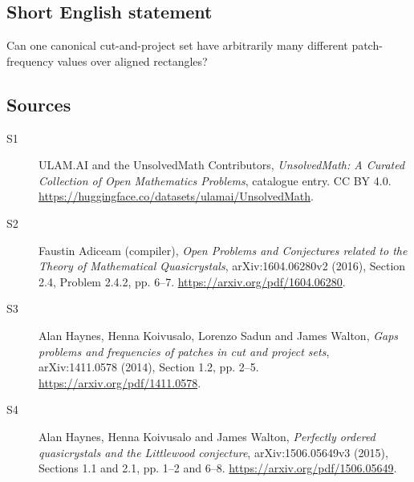 \documentclass[11pt]{article}
\begin{document}
\subsection{Short English statement}
Can one canonical cut-and-project set have arbitrarily many different patch-frequency values over aligned rectangles?
\subsection{Sources}
\begin{description}
\item[\hypertarget{source:statement:1}{S1}] ULAM.AI and the UnsolvedMath Contributors, \emph{UnsolvedMath: A Curated Collection of Open Mathematics Problems}, catalogue entry. CC BY 4.0. \url{https://huggingface.co/datasets/ulamai/UnsolvedMath}.
\item[\hypertarget{source:statement:2}{S2}] Faustin Adiceam (compiler), \emph{Open Problems and Conjectures related to the Theory of Mathematical Quasicrystals}, arXiv:1604.06280v2 (2016), Section 2.4, Problem 2.4.2, pp. 6--7. \url{https://arxiv.org/pdf/1604.06280}.
\item[\hypertarget{source:statement:3}{S3}] Alan Haynes, Henna Koivusalo, Lorenzo Sadun and James Walton, \emph{Gaps problems and frequencies of patches in cut and project sets}, arXiv:1411.0578 (2014), Section 1.2, pp. 2--5. \url{https://arxiv.org/pdf/1411.0578}.
\item[\hypertarget{source:statement:4}{S4}] Alan Haynes, Henna Koivusalo and James Walton, \emph{Perfectly ordered quasicrystals and the Littlewood conjecture}, arXiv:1506.05649v3 (2015), Sections 1.1 and 2.1, pp. 1--2 and 6--8. \url{https://arxiv.org/pdf/1506.05649}.
\end{description}
\label{end:statement}
\end{document}
